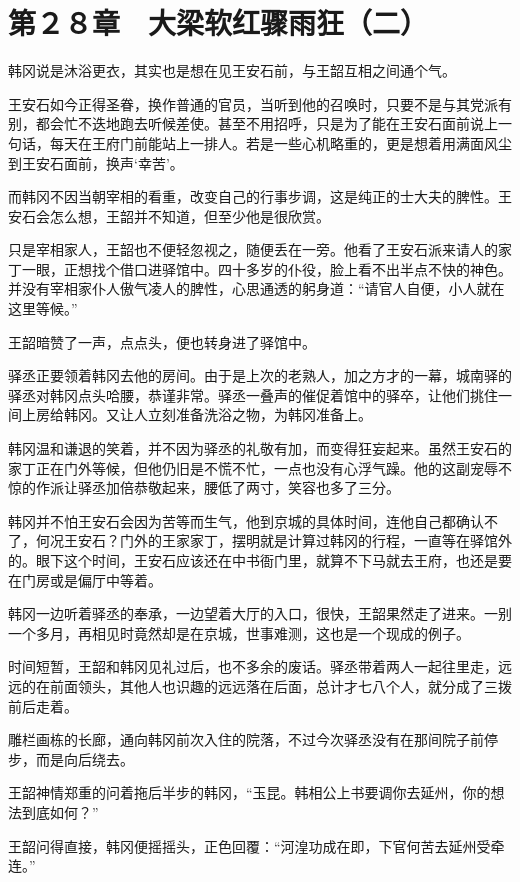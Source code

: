 \section{第２８章　大梁软红骤雨狂（二）}

韩冈说是沐浴更衣，其实也是想在见王安石前，与王韶互相之间通个气。

王安石如今正得圣眷，换作普通的官员，当听到他的召唤时，只要不是与其党派有别，都会忙不迭地跑去听候差使。甚至不用招呼，只是为了能在王安石面前说上一句话，每天在王府门前能站上一排人。若是一些心机略重的，更是想着用满面风尘到王安石面前，换声‘幸苦’。

而韩冈不因当朝宰相的看重，改变自己的行事步调，这是纯正的士大夫的脾性。王安石会怎么想，王韶并不知道，但至少他是很欣赏。

只是宰相家人，王韶也不便轻忽视之，随便丢在一旁。他看了王安石派来请人的家丁一眼，正想找个借口进驿馆中。四十多岁的仆役，脸上看不出半点不快的神色。并没有宰相家仆人傲气凌人的脾性，心思通透的躬身道：“请官人自便，小人就在这里等候。”

王韶暗赞了一声，点点头，便也转身进了驿馆中。

驿丞正要领着韩冈去他的房间。由于是上次的老熟人，加之方才的一幕，城南驿的驿丞对韩冈点头哈腰，恭谨非常。驿丞一叠声的催促着馆中的驿卒，让他们挑住一间上房给韩冈。又让人立刻准备洗浴之物，为韩冈准备上。

韩冈温和谦退的笑着，并不因为驿丞的礼敬有加，而变得狂妄起来。虽然王安石的家丁正在门外等候，但他仍旧是不慌不忙，一点也没有心浮气躁。他的这副宠辱不惊的作派让驿丞加倍恭敬起来，腰低了两寸，笑容也多了三分。

韩冈并不怕王安石会因为苦等而生气，他到京城的具体时间，连他自己都确认不了，何况王安石？门外的王家家丁，摆明就是计算过韩冈的行程，一直等在驿馆外的。眼下这个时间，王安石应该还在中书衙门里，就算不下马就去王府，也还是要在门房或是偏厅中等着。

韩冈一边听着驿丞的奉承，一边望着大厅的入口，很快，王韶果然走了进来。一别一个多月，再相见时竟然却是在京城，世事难测，这也是一个现成的例子。

时间短暂，王韶和韩冈见礼过后，也不多余的废话。驿丞带着两人一起往里走，远远的在前面领头，其他人也识趣的远远落在后面，总计才七八个人，就分成了三拨前后走着。

雕栏画栋的长廊，通向韩冈前次入住的院落，不过今次驿丞没有在那间院子前停步，而是向后绕去。

王韶神情郑重的问着拖后半步的韩冈，“玉昆。韩相公上书要调你去延州，你的想法到底如何？”

王韶问得直接，韩冈便摇摇头，正色回覆：“河湟功成在即，下官何苦去延州受牵连。”

